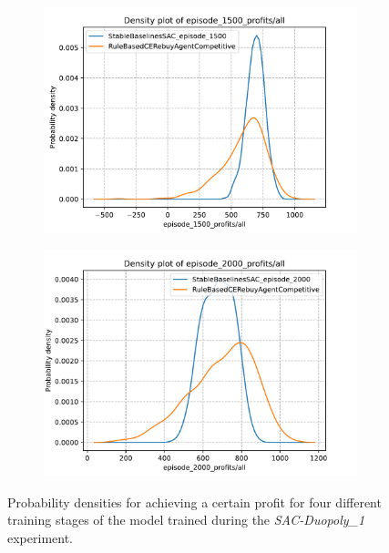 \begin{figure}[t]
\begin{subfigure}{0.49\textwidth}
		\label{fig:SACDuopolyProfitsDensity2}
	\end{subfigure}
	\begin{subfigure}{0.49\textwidth}
		\centering
		\includegraphics[width = \textwidth]{images/experiments/SACDuopoly/SACDuopolyProfitsDensity3.pdf}\\
		\label{fig:SACDuopolyProfitsDensity3}
	\end{subfigure}
	\begin{subfigure}{0.49\textwidth}
		\centering
		\includegraphics[width = \textwidth]{images/experiments/SACDuopoly/SACDuopolyProfitsDensity4.pdf}\\
		\label{fig:SACDuopolyProfitsDensity4}
	\end{subfigure}
	\caption{Probability densities for achieving a certain profit for four different training stages of the model trained during the \emph{SAC-Duopoly\_1} experiment.}\label{fig:SACDuopolyProfitsDensity}
\end{figure}

